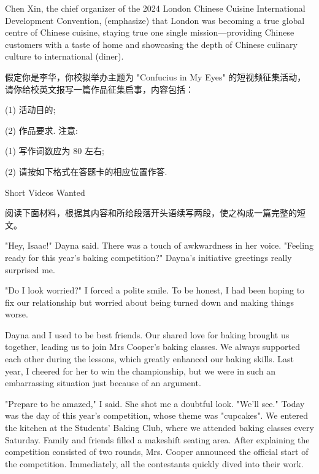 \documentclass{英语试卷}
\begin{document}
\par Chen Xin, the chief organizer of the 2024 London Chinese Cuisine International Development Convention,  (emphasize) that London was becoming a true global centre of Chinese cuisine, staying true  one single mission—providing Chinese customers with a taste of home and showcasing the depth of Chinese culinary culture to international  (diner).\par
{}
\par 假定你是李华，你校拟举办主题为 "Confucius in My Eyes" 的短视频征集活动，请你给校英文报写一篇作品征集启事，内容包括：\par
\par (1) 活动目的;\par
\par (2) 作品要求. 注意:\par
\par (1) 写作词数应为 80 左右;\par
\par (2) 请按如下格式在答题卡的相应位置作答.\par
\par Short Videos Wanted\par
{}
\par 阅读下面材料，根据其内容和所给段落开头语续写两段，使之构成一篇完整的短文。\par
\par "Hey, Isaac!" Dayna said. There was a touch of awkwardness in her voice. "Feeling ready for this year's baking competition?" Dayna's initiative greetings really surprised me.\par
\par "Do I look worried?" I forced a polite smile. To be honest, I had been hoping to fix our relationship but worried about being turned down and making things worse.\par
\par Dayna and I used to be best friends. Our shared love for baking brought us together, leading us to join Mrs Cooper's baking classes. We always supported each other during the lessons, which greatly enhanced our baking skills. Last year, I cheered for her to win the championship, but we were in such an embarrassing situation just because of an argument.\par
\par "Prepare to be amazed," I said. She shot me a doubtful look. "We'll see." Today was the day of this year's competition, whose theme was "cupcakes". We entered the kitchen at the Students' Baking Club, where we attended baking classes every Saturday. Family and friends filled a makeshift seating area. After explaining the competition consisted of two rounds, Mrs. Cooper announced the official start of the competition. Immediately, all the contestants quickly dived into their work.\par
\end{document}
